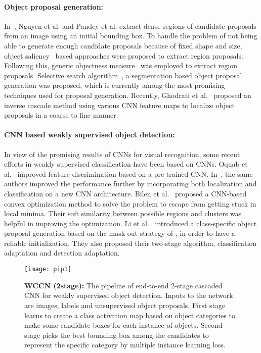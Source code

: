 \documentclass[10pt,twocolumn,letterpaper]{article}
\begin{document}
\paragraph{Object proposal generation:}
 In~\cite{Nguyen,Pandey}, Nguyen et al. and Pandey et al. extract dense regions of candidate proposals from an image using an initial bounding box. To handle the problem of not being able to generate enough candidate proposals because of fixed shape and size, object saliency~\cite{does10,Siva12,siva} based approaches were proposed to extract region proposals. Following this, generic objectness measure~\cite{alex10} was employed to extract region proposals. Selective search algorithm~\cite{SS}, a segmentation based object proposal generation was proposed, which is currently among the most promising techniques used for proposal generation. Recently, Ghodrati et al.~\cite{diba} proposed an inverse cascade method using various CNN feature maps to localize object proposals in a coarse to fine manner. 


\paragraph{CNN based weakly supervised object detection:}
In view of the promising results of CNNs for visual recognition, some recent efforts in weakly supervised classification have been based on CNNs. Oquab et al.~\cite{Oquab14} improved feature discrimination based on a pre-trained CNN. In~\cite{laptev15}, the same authors improved the performance further by incorporating both localization and classification on a new CNN architecture. Bilen et al.~\cite{bilen14} proposed a CNN-based convex optimization method to solve the problem to escape from getting stuck in local minima. Their soft similarity between possible regions and clusters was helpful in improving the optimization. Li et al.~\cite{li16} introduced a class-specific object proposal generation based on the mask out strategy of \cite{bazzani}, in order to have  a reliable initialization. They also proposed their two-stage algorithm, classification adaptation and detection adaptation.  



\begin{figure*}[ht]
 \centering
 \texttt{[image: pip1]}
 \caption{\textbf{WCCN (2stage):} The pipeline of end-to-end 2-stage cascaded CNN for weakly supervised object detection. Inputs to the network are images, labels and unsupervised object proposals. First stage learns to create a class activation map based on object categories to make some candidate boxes for each instance of objects. Second stage picks the best bounding box among the candidates to represent the specific category by multiple instance learning loss.}
  \label{fig:2}
 \end{figure*} 
\end{document}
